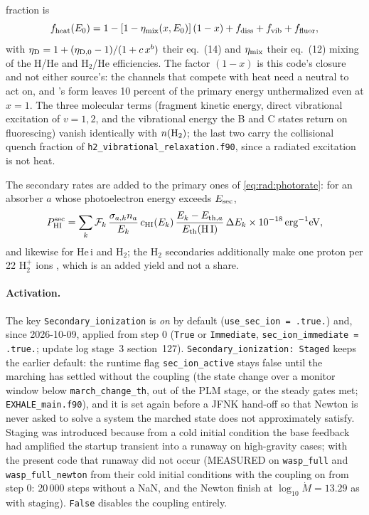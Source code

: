 fraction is
\begin{equation}
f_{\rm heat}(E_0) = 1 - \left[1-\eta_{\rm mix}(x,E_0)\right](1-x)
                     + f_{\rm diss} + f_{\rm vib} + f_{\rm fluor},
\label{eq:rad:fheat}
\end{equation}
with $\eta_{\rm D} = 1 + (\eta_{\rm D,0}-1)/(1+c\,x^{b})$ their eq.~(14) and
$\eta_{\rm mix}$ their eq.~(12) mixing of the H/He and H$_2$/He efficiencies.
The factor $(1-x)$ is this code's closure and not either source's: the
channels that compete with heat need a neutral to act on, and
\citeauthor{Dalgarno1999}'s form leaves 10 percent of the primary energy unthermalized even at
$x=1$. The three molecular terms (fragment kinetic energy, direct
vibrational excitation of $v=1,2$, and the vibrational energy the B and C
states return on fluorescing) vanish identically with $n({\rm H}_2)$; the
last two carry the collisional quench fraction of
\texttt{h2\_vibrational\_relaxation.f90}, since a radiated excitation is not
heat.

The secondary rates are added to the primary ones of
\eqref{eq:rad:photorate}: for an absorber $a$ whose photoelectron energy
exceeds $E_{\rm sec}$,
\begin{equation}
P^{\rm sec}_{\rm HI} = \sum_k \mathcal{F}_k\,
   \frac{\sigma_{a,k}n_a}{E_k}\,c_{\rm HI}(E_k)\,
   \frac{E_k-E_{{\rm th},a}}{E_{\rm th}({\rm H\,I})}\,\Delta E_k
   \times 10^{-18}\,\mathrm{erg^{-1}eV},
\label{eq:rad:secrate}
\end{equation}
and likewise for He\,{\sc i} and H$_2$; the H$_2$ secondaries additionally
make one proton per 22 H$_2^+$ ions \citep[after their eq.~10]{Dalgarno1999}, which is an added yield and not a share.

\paragraph{Activation.} The key \texttt{Secondary\_ionization} is
\emph{on} by default (\texttt{use\_sec\_ion = .true.}) and, since 2026-10-09,
applied from step 0 (\texttt{True} or \texttt{Immediate},
\texttt{sec\_ion\_immediate = .true.}; update log stage~3 section~127).
\texttt{Secondary\_ionization: Staged} keeps the earlier default: the runtime
flag \texttt{sec\_ion\_active} stays false until the marching has settled
without the coupling (the state change over a monitor window below
\texttt{march\_change\_th}, out of the PLM stage, or the steady gates met;
\texttt{EXHALE\_main.f90}), and it is set again before a JFNK hand-off so
that Newton is never asked to solve a system the marched state does not
approximately satisfy. Staging was introduced because from a cold initial
condition the base feedback had amplified the startup transient into a
runaway on high-gravity cases; with the present code that runaway did not
occur (MEASURED on \texttt{wasp\_full} and \texttt{wasp\_full\_newton} from
their cold initial conditions with the coupling on from step 0: 20\,000 steps
without a NaN, and the Newton finish at $\log_{10}\dot M=13.29$ as with
staging). \texttt{False} disables the coupling entirely.

